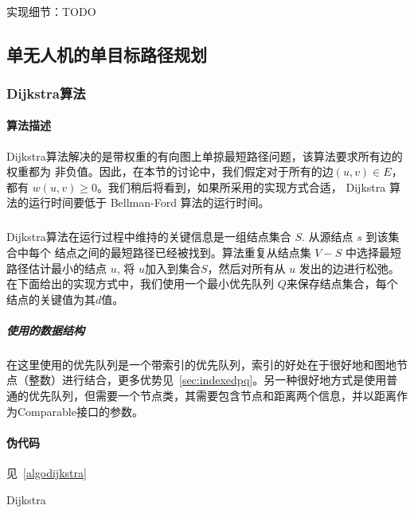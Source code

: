 \documentclass[UTF8,a4paper]{ctexart}
\begin{document}
\paragraph{}实现细节：TODO


\subsection{单无人机的单目标路径规划}
\subsubsection{Dijkstra算法}\label{sec:dijkstra}
\paragraph{算法描述}Dijkstra算法解决的是带权重的有向图上单掠最短路径问题，该算法要求所有边的权重都为 非负值。因此，在本节的讨论中，我们假定对于所有的边$(u,v)\in E$，都有 $w(u,v)\geq 0$。我们稍后将看到，如果所采用的实现方式合适， Dijkstra 算法的运行时间要低于 Bellman-Ford 算法的运行时间。
\subparagraph{}Dijkstra算法在运行过程中维持的关键信息是一组结点集合 {$S$}. 从源结点 {$s$} 到该集合中每个 结点之间的最短路径已经被找到。算法重复从结点集 $V-S$ 中选择最短路径估计最小的结点 $u$, 将 $u$加入到集合$S$，然后对所有从 $u$ 发出的边进行松弛。在下面给出的实现方式中，我们使用一个最小优先队列 $Q$来保存结点集合，每个结点的关键值为其$d$值。
\subparagraph{使用的数据结构}在这里使用的优先队列是一个带索引的优先队列，索引的好处在于很好地和图地节点（整数）进行结合，更多优势见~\ref{sec:indexedpq}。另一种很好地方式是使用普通的优先队列，但需要一个节点类，其需要包含节点和距离两个信息，并以距离作为Comparable接口的参数。
\paragraph{伪代码}见~\ref{algodijkstra}
\begin{algorithm}
    \caption{Dijkstra}\label{algodijkstra}
    \begin{algorithmic}[1] %
        \EndFor
        \EndFunction
        \State
        \EndIf
        \EndFunction
        \State
        \State {}
        \State {}
        \EndFor
        \EndWhile
        \EndFunction
    \end{algorithmic}
\end{algorithm}
\end{document}
